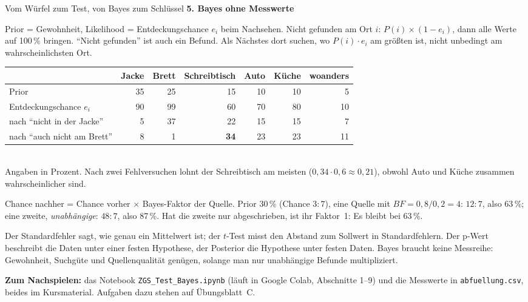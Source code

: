 \begin{handout}{Vom Würfel zum Test, von Bayes zum Schlüssel}
\newpage
\textbf{5. Bayes ohne Messwerte}
\begin{description}\itemsep 0pt
  \item[Wo ist mein Schlüssel?] Prior = Gewohnheit, Likelihood =
    Entdeckungschance $e_i$ beim Nachsehen. Nicht gefunden am Ort $i$:
    $P(i)\times(1-e_i)$, dann alle Werte auf 100\,\% bringen.
    \enquote{Nicht gefunden} ist auch ein Befund. Als Nächstes dort
    suchen, wo $P(i)\cdot e_i$ am größten ist, nicht unbedingt am
    wahrscheinlichsten Ort.
\end{description}
\begin{center}
\small
\begin{tabular}{@{}lrrrrrr@{}}
\toprule
 & Jacke & Brett & Schreibtisch & Auto & Küche & woanders \\
\midrule
Prior & 35 & 25 & 15 & 10 & 10 & 5 \\
Entdeckungschance $e_i$ & 90 & 99 & 60 & 70 & 80 & 10 \\
nach \enquote{nicht in der Jacke} & 5 & 37 & 22 & 15 & 15 & 7 \\
nach \enquote{auch nicht am Brett} & 8 & 1 & \textbf{34} & 23 & 23 & 11 \\
\bottomrule
\end{tabular}\\[0.5ex]
{\footnotesize Angaben in Prozent. Nach zwei Fehlversuchen lohnt der
Schreibtisch am meisten ($0{,}34\cdot0{,}6\approx0{,}21$), obwohl Auto und
Küche zusammen wahrscheinlicher sind.}
\end{center}
\begin{description}\itemsep 0pt
  \item[Glaube ich dieser Quelle?] Chance nachher = Chance vorher
    $\times$ Bayes-Faktor der Quelle. Prior 30\,\% (Chance $3:7$), eine
    Quelle mit $\mathit{BF}=0{,}8/0{,}2=4$: $12:7$, also 63\,\%; eine
    zweite, \emph{unabhängige}: $48:7$, also 87\,\%. Hat die zweite nur
    abgeschrieben, ist ihr Faktor~1: Es bleibt bei 63\,\%.
\end{description}

\begin{merkbox}
Der Standardfehler sagt, wie genau ein Mittelwert ist; der $t$-Test
misst den Abstand zum Sollwert in Standardfehlern. Der p-Wert beschreibt
die Daten unter einer festen Hypothese, der Posterior die Hypothese unter
festen Daten. Bayes braucht keine Messreihe: Gewohnheit, Suchgüte und
Quellenqualität genügen, solange man nur unabhängige Befunde
multipliziert.
\end{merkbox}

\textbf{Zum Nachspielen:} das Notebook \texttt{ZGS\_Test\_Bayes.ipynb}
(läuft in Google Colab, Abschnitte 1--9) und die Messwerte in
\texttt{abfuellung.csv}, beides im Kursmaterial. Aufgaben dazu stehen
auf Übungsblatt~C.
\end{handout}


